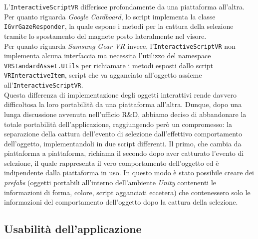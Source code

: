 L'\texttt{InteractiveScriptVR} differisce profondamente da una piattaforma all'altra. \\
Per quanto riguarda \textit{Google Cardboard}, lo script implementa la classe \texttt{IGvrGazeResponder}, la quale espone i metodi per la cattura della selezione tramite lo spostamento del magnete posto lateralmente nel visore. \\
Per quanto riguarda \textit{Samsung Gear VR} invece, l'\texttt{InteractiveScriptVR} non implementa alcuna interfaccia ma necessita l'utilizzo del namespace \texttt{VRStandardAsset.Utils} per richiamare i metodi esposti dallo script \texttt{VRInteractiveItem}, script che va agganciato all'oggetto assieme all'\texttt{InteractiveScriptVR}. \\
Questa differenza di implementazione degli oggetti interattivi rende davvero difficoltosa la loro portabilità da una piattaforma all'altra. Dunque, dopo una lunga discussione avvenuta nell'ufficio R\&D, abbiamo deciso di abbandonare la totale portabilità dell'applicazione, raggiungendo però un compromesso: la separazione della cattura dell'evento di selezione dall'effettivo comportamento dell'oggetto, implementandoli in due script differenti. Il primo, che cambia da piattaforma a piattaforma, richiama il secondo dopo aver catturato l'evento di selezione, il quale rappresenta il vero comportamento dell'oggetto ed è indipendente dalla piattaforma in uso. In questo modo è stato possibile creare dei \textit{prefabs} (oggetti portabili all'interno dell'ambiente \textit{Unity} contenenti le informazioni di forma, colore, script agganciati eccetera) che contenessero solo le informazioni del comportamento dell'oggetto dopo la cattura della selezione.    

\subsection{Usabilità dell'applicazione}

